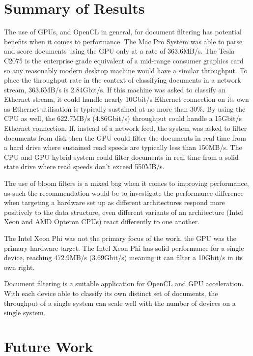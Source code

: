\section{Summary of Results}

The use of GPUs, and OpenCL in general, for document filtering has potential
benefits when it comes to performance. The Mac Pro System was able to parse and
score documents using the GPU only at a rate of 363.6MB/s. The Tesla C2075 is
the enterprise grade equivalent of a mid-range consumer graphics card so any
reasonably modern desktop machine would have a similar throughput. To place the
throughput rate in the context of classifying documents in a network stream,
363.6MB/s is 2.84Gbit/s. If this machine was asked to classify an Ethernet
stream, it could handle nearly 10Gbit/s Ethernet connection on its own as
Ethernet utilisation is typically sustained at no more than 30\%. By using the
CPU as well, the 622.7MB/s (4.86Gbit/s) throughput could handle a 15Gbit/s
Ethernet connection. If, instead of a network feed, the system was asked to
filter documents from disk then the GPU could filter the documents in real time
from a hard drive where sustained read speeds are typically less than 150MB/s.
The CPU and GPU hybrid system could filter documents in real time from a solid
state drive where read speeds don't exceed 550MB/s.

The use of bloom filters is a mixed bag when it comes to improving performance,
as such the recommendation would be to investigate the performance difference
when targeting a hardware set up as different architectures respond more
positively to the data structure, even different variants of an architecture
(Intel Xeon and AMD Opteron CPUs) react differently to one another.

The Intel Xeon Phi was not the primary focus of the work, the GPU was the
primary hardware target. The Intel Xeon Phi has solid performance for a single
device, reaching 472.9MB/s (3.69Gbit/s) meaning it can filter a 10Gbit/s in its
own right.

Document filtering is a suitable application for OpenCL and GPU acceleration.
With each device able to classify its own distinct set of documents, the
throughput of a single system can scale well with the number of devices on a
single system.

\section{Future Work}


